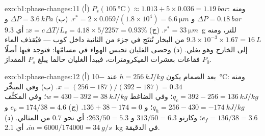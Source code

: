 \begin{solution}{exo:b1:phase-changes:11}
(أ) $P_s(\qty{105}{\degreeCelsius}) \approx 1.013 + 5 \times 0.036 = \qty{1.19}{bar}$:
ومنه $\Delta P = \qty{0.18}{bar}$ و $r^\ast = 2 \times 0.059/(1.8 \times 10^4) = \qty{6.6}{\micro m}$.
(ب) $\Delta P = \qty{3.6}{kPa}$ و $r^\ast = \qty{33}{\micro m}$. (ج) $x = c\,\Delta T/L_v =
4.18 \times 5/2257 = 0.93\%$: أي \qty{9.3}{g} للتر، ومنه $9.3 \times 10^{-3}
\times 1.67 = \qty{16}{L}$ من البخار تُنتَج في جزء من الثانية داخل
كوب --- فيُقذف الماء إلى الخارج وهو يغلي. (د) وحصى الغليان تحبس الهواء في
مسامّها: فتوجد فيها أصلًا فقاعات بعشرات الميكرومترات، فيبدأ الغليان
حالما يبلغ $P_s$ المقدارَ $P_0$.
\end{solution}

\begin{solution}{exo:b1:phase-changes:12}
(أ) بعد الصمام يكون $h = \qty{256}{kJ/kg}$ عند \qty{-10}{\degreeCelsius}: ومنه $x =
(256 - 187)/(392 - 187) = 0.34$. (ب) وفي المبخِّر $q_c = 392 - 256 =
\qty{136}{kJ/kg}$؛ وفي الضاغط $w = 430 - 392 = \qty{38}{kJ/kg}$؛ وفي المكثِّف
$q_h = 256 - 430 = \qty{-174}{kJ/kg}$؛ و $136 + 38 - 174 = 0$. (ج) $e_p =
174/38 = 4.6$ و $e_f = 136/38 = 3.6$؛ وكارنو $313/50 = 6.3$ و $263/50 =
5.3$: أي نحو $0.7$ من المثالي. (د) $\dot m = 6000/174000 = \qty{34}{g/s}$،
أي \qty{2.1}{kg} في الدقيقة.
\end{solution}


